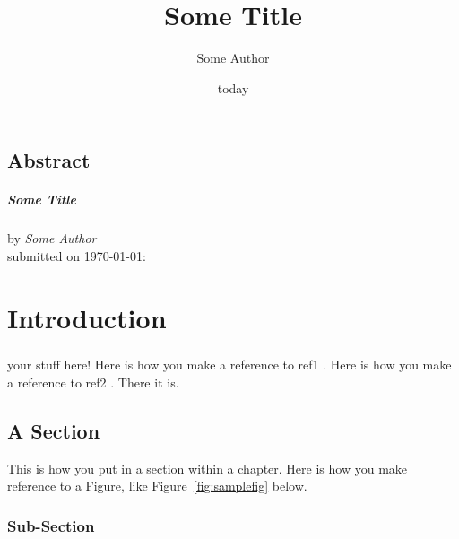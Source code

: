 \documentclass[12pt, oneside]{smuthesis}
\begin{document}
\frontmatter
\title{\sc Some Title}
\author{Some Author}
\date{today}
\medskip

\maketitle
\pagestyle{headings}

\begin{center}
\section*{\center \sc Abstract}
\paragraph*{\center \sc Some Title\\}
by {\em Some Author}\\
submitted on \today:\\
\end{center}
\newpage

\tableofcontents
\listoffigures
\listoftables
\newpage
%
\mainmatter
\chapter{\sc Introduction}
\paragraph*{}

your stuff here! Here is how you make a reference to ref1 \citep{test1}. Here is how you make a reference to ref2 \citep{test2}. There it is.

\section{\sc A Section}

This is how you put in a section within a chapter.
Here is how you make reference to a Figure, like Figure~\ref{fig:samplefig}
 below.


\subsection{\sc Sub-Section}
\end{document}

